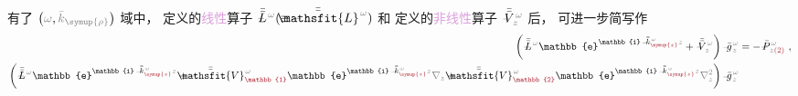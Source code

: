 有了 $\left( \mathcolor{gray}{\omega}, \mathcolor{gray}{\bar{k}_{\symup{\rho}}} \right)$ 域中， 定义的\textcolor{Plum}{线性}算子 $\xint{\mathcolor{gray}{-}}{30}{\bar{\bar{L}}}^{\;\! \mathcolor{gray}{\omega}} (\equiv \xint{\mathcolor{gray}{-}}{25}{\bar{\bar{\mathsfit{L}}}}^{\;\! \mathcolor{gray}{\omega}})$ 和  定义的\textcolor{Plum}{非线性}算子 $\xint{\mathcolor{gray}{-}}{21}{\bar{\bar{V}}}^{\;\! \mathcolor{gray}{\omega}}_{\;\! \mathcolor{gray}{z}}$ 后， 可进一步简写作
\begin{subequations}
\begin{align}
	\left( \xint{\mathcolor{gray}{-}}{32}{\bar{\bar{L}}}^{\;\! \mathcolor{gray}{\omega}} \mathbb{e}^{\mathbb{i} \xint{\begin{smallmatrix} ~ \\ {}^{}_{\mathcolor{gray}{-}} \\ ~ \end{smallmatrix}}{15}{\bar{\bar{k}}}_{\textcolor{Maroon}{\symup{z}}}^{\;\! \mathcolor{gray}{\omega}} \mathcolor{gray}{z}} + \xint{\mathcolor{gray}{-}}{25}{\bar{\bar{V}}}^{\;\! \mathcolor{gray}{\omega}}_{\;\! \mathcolor{gray}{z}} \right) \xint{{}^{}_{\mathcolor{gray}{-}}}{10}{\bar{g}}^{\;\!\mathcolor{gray}{\omega}}_{\;\! \mathcolor{gray}{z}}
	&= - \xint{\mathcolor{gray}{-}}{30}{\bar{P}}^{\;\! \mathcolor{gray}{\omega}}_{\;\! \mathcolor{gray}{z} \textcolor{Maroon}{(2)}} ~, \label{eq:nonlinear(2)-wave_wkrho-simplify6} \\
	\left( \xint{\mathcolor{gray}{-}}{32}{\bar{\bar{L}}}^{\;\! \mathcolor{gray}{\omega}} \mathbb{e}^{\mathbb{i} \xint{\begin{smallmatrix} ~ \\ {}^{}_{\mathcolor{gray}{-}} \\ ~ \end{smallmatrix}}{15}{\bar{\bar{k}}}_{\textcolor{Maroon}{\symup{z}}}^{\;\! \mathcolor{gray}{\omega}} \mathcolor{gray}{z}} + \xint{\mathcolor{gray}{-}}{25}{\bar{\bar{\mathsfit{V}}}}^{\;\! \mathcolor{gray}{\omega}}_{\textcolor{Maroon}{\mathbb{1}}} \mathbb{e}^{\mathbb{i} \xint{\begin{smallmatrix} ~ \\ {}^{}_{\mathcolor{gray}{-}} \\ ~ \end{smallmatrix}}{15}{\bar{\bar{k}}}_{\textcolor{Maroon}{\symup{z}}}^{\;\! \mathcolor{gray}{\omega}} \mathcolor{gray}{z}} \mathcolor{gray}{\nabla_z} + \xint{\mathcolor{gray}{-}}{25}{\bar{\bar{\mathsfit{V}}}}^{\;\! \mathcolor{gray}{\omega}}_{\textcolor{Maroon}{\mathbb{2}}} \mathbb{e}^{\mathbb{i} \xint{\begin{smallmatrix} ~ \\ {}^{}_{\mathcolor{gray}{-}} \\ ~ \end{smallmatrix}}{15}{\bar{\bar{k}}}_{\textcolor{Maroon}{\symup{z}}}^{\;\! \mathcolor{gray}{\omega}} \mathcolor{gray}{z}} \mathcolor{gray}{\nabla_z^2} \right) \xint{{}^{}_{\mathcolor{gray}{-}}}{10}{\bar{g}}^{\;\!\mathcolor{gray}{\omega}}_{\;\! \mathcolor{gray}{z}}

\end{align}
\end{subequations}
